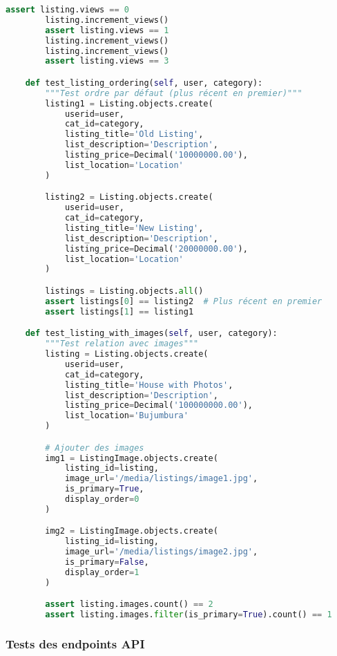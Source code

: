 \begin{lstlisting}[language=Python, caption=listings/tests/test\_models.py]
        assert listing.views == 0
        listing.increment_views()
        assert listing.views == 1
        listing.increment_views()
        listing.increment_views()
        assert listing.views == 3

    def test_listing_ordering(self, user, category):
        """Test ordre par défaut (plus récent en premier)"""
        listing1 = Listing.objects.create(
            userid=user,
            cat_id=category,
            listing_title='Old Listing',
            list_description='Description',
            listing_price=Decimal('10000000.00'),
            list_location='Location'
        )

        listing2 = Listing.objects.create(
            userid=user,
            cat_id=category,
            listing_title='New Listing',
            list_description='Description',
            listing_price=Decimal('20000000.00'),
            list_location='Location'
        )

        listings = Listing.objects.all()
        assert listings[0] == listing2  # Plus récent en premier
        assert listings[1] == listing1

    def test_listing_with_images(self, user, category):
        """Test relation avec images"""
        listing = Listing.objects.create(
            userid=user,
            cat_id=category,
            listing_title='House with Photos',
            list_description='Description',
            listing_price=Decimal('100000000.00'),
            list_location='Bujumbura'
        )

        # Ajouter des images
        img1 = ListingImage.objects.create(
            listing_id=listing,
            image_url='/media/listings/image1.jpg',
            is_primary=True,
            display_order=0
        )

        img2 = ListingImage.objects.create(
            listing_id=listing,
            image_url='/media/listings/image2.jpg',
            is_primary=False,
            display_order=1
        )

        assert listing.images.count() == 2
        assert listing.images.filter(is_primary=True).count() == 1
\end{lstlisting}

\subsubsection{Tests des endpoints API}

